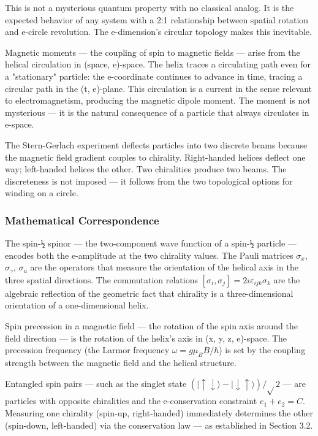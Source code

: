 \documentclass[aps,prd,preprint,superscriptaddress,longbibliography,floatfix]{revtex4-2}
\theoremstyle{remark}
\begin{document}
This is not a mysterious quantum property with no classical analog. It is the expected behavior of any system with a 2:1 relationship between spatial rotation and e-circle revolution. The e-dimension's circular topology makes this inevitable.

Magnetic moments --- the coupling of spin to magnetic fields --- arise from the helical circulation in (space, e)-space. The helix traces a circulating path even for a "stationary" particle: the e-coordinate continues to advance in time, tracing a circular path in the (t, e)-plane. This circulation is a current in the sense relevant to electromagnetism, producing the magnetic dipole moment. The moment is not mysterious --- it is the natural consequence of a particle that always circulates in e-space.

The Stern-Gerlach experiment deflects particles into two discrete beams because the magnetic field gradient couples to chirality. Right-handed helices deflect one way; left-handed helices the other. Two chiralities produce two beams. The discreteness is not imposed --- it follows from the two topological options for winding on a circle.


\subsubsection{Mathematical Correspondence}

The spin-\texttt{½} spinor --- the two-component wave function of a spin-\texttt{½} particle --- encodes both the e-amplitude at the two chirality values. The Pauli matrices $\sigma_{x}$, $\sigma_{\gamma}$, $\sigma_{u}$ are the operators that measure the orientation of the helical axis in the three spatial directions. The commutation relations $[\sigma_{i}, \sigma_{j}] = 2i\varepsilon_{ijk}\sigma_{k}$ are the algebraic reflection of the geometric fact that chirality is a three-dimensional orientation of a one-dimensional helix.

Spin precession in a magnetic field --- the rotation of the spin axis around the field direction --- is the rotation of the helix's axis in (x, y, z, e)-space. The precession frequency (the Larmor frequency $\omega = g\mu_B B/\hbar$) is set by the coupling strength between the magnetic field and the helical structure.

Entangled spin pairs --- such as the singlet state $(|\uparrow\downarrow\rangle - |\downarrow\uparrow\rangle)/\sqrt{}2$ --- are particles with opposite chiralities and the e-conservation constraint $e_{1} + e_{2} = C$. Measuring one chirality (spin-up, right-handed) immediately determines the other (spin-down, left-handed) via the conservation law --- as established in Section 3.2.
\end{document}
